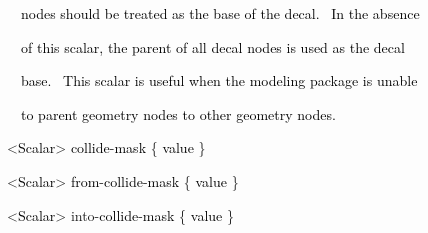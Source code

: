\documentclass[a4paper]{article}
\newcommand\textstyleOOoComputerKeyWord[1]{\textrm{\textcolor[rgb]{0.0,0.0,0.5019608}{#1}}}
\newcommand\textstyleOOoAssemblerSpecialChar[1]{\textrm{\textcolor[rgb]{0.0,0.5019608,0.0}{#1}}}
\newcommand\textstyleOOoAssemblerIdent[1]{\textrm{\textcolor{black}{#1}}}
\newcommand\textstyleOOoAssemblerInstruction[1]{\textrm{\textcolor[rgb]{0.0,0.0,0.49803922}{#1}}}
\begin{document}
{\color{black}
\textstyleOOoComputerKeyWord{\textcolor{black}{\ \ \ \ nodes should be treated as the base of the decal. \ In the
absence}}}

{\color{black}
\textstyleOOoComputerKeyWord{\textcolor{black}{\ \ \ \ of this scalar, the parent of all decal nodes is used as the
decal}}}

{\color{black}
\textstyleOOoComputerKeyWord{\textcolor{black}{\ \ \ \ base. \ This scalar is useful when the modeling package is
unable}}}

{\color{black}
\textstyleOOoComputerKeyWord{\textcolor{black}{\ \ \ \ to parent geometry nodes to other geometry nodes.}}}


\bigskip

\clearpage
\bigskip

{\color{black}
\textstyleOOoComputerKeyWord{\textcolor{black}{\ \ }}\textstyleOOoAssemblerSpecialChar{{\textless}}\textstyleOOoAssemblerIdent{Scalar}\textstyleOOoAssemblerSpecialChar{{\textgreater}}\textstyleOOoComputerKeyWord{\textcolor{black}{
}}\textstyleOOoAssemblerIdent{collide}\textstyleOOoAssemblerSpecialChar{{}-}\textstyleOOoAssemblerIdent{mask}\textstyleOOoComputerKeyWord{\textcolor{black}{
}}\textstyleOOoAssemblerSpecialChar{\{}\textstyleOOoComputerKeyWord{\textcolor{black}{
}}\textstyleOOoAssemblerIdent{value}\textstyleOOoComputerKeyWord{\textcolor{black}{
}}\textstyleOOoAssemblerSpecialChar{\}}}

{\color{black}
\textstyleOOoComputerKeyWord{\textcolor{black}{\ \ }}\textstyleOOoAssemblerSpecialChar{{\textless}}\textstyleOOoAssemblerIdent{Scalar}\textstyleOOoAssemblerSpecialChar{{\textgreater}}\textstyleOOoComputerKeyWord{\textcolor{black}{
}}\textstyleOOoAssemblerIdent{from}\textstyleOOoAssemblerSpecialChar{{}-}\textstyleOOoAssemblerIdent{collide}\textstyleOOoAssemblerSpecialChar{{}-}\textstyleOOoAssemblerIdent{mask}\textstyleOOoComputerKeyWord{\textcolor{black}{
}}\textstyleOOoAssemblerSpecialChar{\{}\textstyleOOoComputerKeyWord{\textcolor{black}{
}}\textstyleOOoAssemblerIdent{value}\textstyleOOoComputerKeyWord{\textcolor{black}{
}}\textstyleOOoAssemblerSpecialChar{\}}}

{\color{black}
\textstyleOOoComputerKeyWord{\textcolor{black}{\ \ }}\textstyleOOoAssemblerSpecialChar{{\textless}}\textstyleOOoAssemblerIdent{Scalar}\textstyleOOoAssemblerSpecialChar{{\textgreater}}\textstyleOOoComputerKeyWord{\textcolor{black}{
}}\textstyleOOoAssemblerInstruction{into}\textstyleOOoAssemblerSpecialChar{{}-}\textstyleOOoAssemblerIdent{collide}\textstyleOOoAssemblerSpecialChar{{}-}\textstyleOOoAssemblerIdent{mask}\textstyleOOoComputerKeyWord{\textcolor{black}{
}}\textstyleOOoAssemblerSpecialChar{\{}\textstyleOOoComputerKeyWord{\textcolor{black}{
}}\textstyleOOoAssemblerIdent{value}\textstyleOOoComputerKeyWord{\textcolor{black}{
}}\textstyleOOoAssemblerSpecialChar{\}}}
\end{document}
